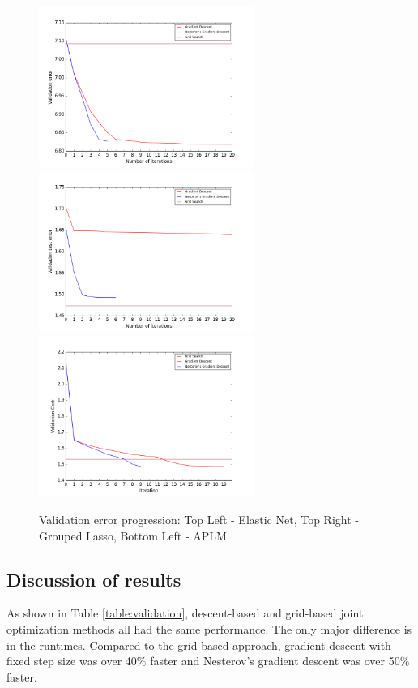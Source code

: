 \documentclass[10pt,letterpaper]{article}
\begin{document}
\begin{figure} 
\includegraphics[width=70mm]{elasticnet_costpath_80_250_15.png}
\includegraphics[width=70mm]{grouped_lasso_60_1500_3_150.png}
\includegraphics[width=70mm]{smooth_linear_simple_cost_path_1_100_20_6.png}
\caption{Validation error progression: Top Left - Elastic Net, Top Right - Grouped Lasso, Bottom Left - APLM}
\label{figure:costpath}
\end{figure}

\subsection{Discussion of results}

As shown in Table \ref{table:validation}, descent-based and grid-based joint optimization methods all had the same performance. The only major difference is in the runtimes. Compared to the grid-based approach, gradient descent with fixed step size was over 40\% faster and Nesterov's gradient descent was over 50\% faster.
\end{document}
